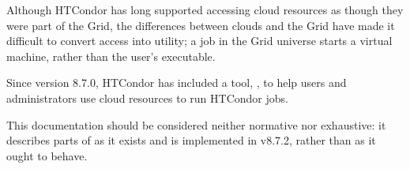 Although HTCondor has long supported accessing cloud resources as though they
were part of the Grid, the differences between clouds and the Grid have
made it difficult to convert access into utility; a job in the Grid universe
starts a virtual machine, rather than the user's executable.

Since version 8.7.0, HTCondor has included a tool, , to help
users and administrators use cloud resources to run HTCondor jobs.

This documentation should be considered neither normative nor exhaustive:
it describes parts of  as it exists and is implemented
in v8.7.2, rather than as it ought to behave.








